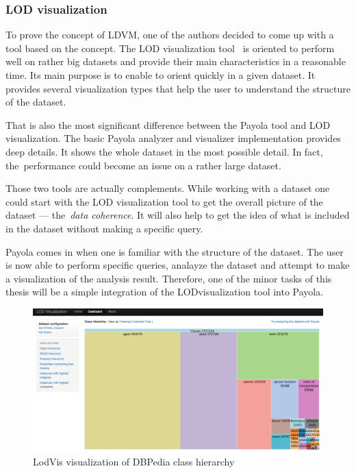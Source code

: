 \subsubsection{LOD visualization}
To prove the concept of LDVM, one of the authors decided to come up with a tool 
based on the concept. The LOD visualization tool~\cite{lodvis} is oriented
to perform well on rather big datasets and 
provide their main characteristics in a reasonable time. Its main purpose is to 
enable to orient quickly in a given dataset. It provides several 
visualization types that help the user to understand the structure of the 
dataset.

That is also the most significant difference between the Payola tool and LOD 
visualization. The basic Payola analyzer and visualizer implementation provides 
deep details. It shows the whole dataset in the most possible detail. In fact, 
the~performance could become an issue on a rather large dataset.

Those two tools are actually complements. While working with a dataset one could 
start with the LOD visualization tool to get the overall picture of the dataset --- 
the~\emph{data coherence}. It will also help to get the idea of what is included in the 
dataset without making a specific query.

Payola comes in when one is familiar with the structure of the dataset. The user 
is now able to perform specific queries, analayze the dataset and attempt to make a 
visualization of the analysis result. Therefore, one of the minor tasks of this thesis
will be a simple integration of the LODvisualization tool into Payola.

\begin{figure}
	\centering
	\includegraphics[width=140mm]{img/lodvis.png}
	\caption{LodVis visualization of DBPedia class hierarchy}
	\label{fig:lodvis}
\end{figure}

